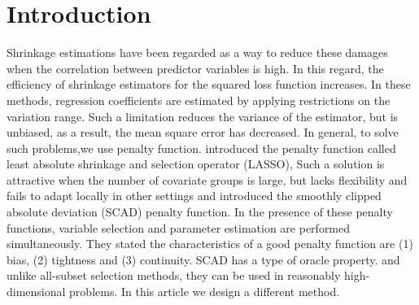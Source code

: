 \section{Introduction}
\qquad Shrinkage estimations have been regarded as a way to reduce these damages when the correlation between predictor variables is high. In this regard, the efficiency of shrinkage estimators for the squared loss function increases. In these methods, regression coefficients are estimated by applying restrictions on the variation range. Such a limitation reduces the variance of the estimator, but is unbiased, as a result, the mean square error has decreased. In general, to solve such problems,we use penalty function. \cite{Tibshirani1996} introduced the penalty function called least absolute shrinkage and selection operator (LASSO), Such a solution is attractive when the number of covariate groups is large, but lacks flexibility and fails to adapt locally in other settings and \hbox{\cite{Fan-Li2001}} introduced the smoothly clipped absolute deviation (SCAD) penalty function. In the presence of these penalty functions, variable selection and parameter estimation are performed simultaneously. They stated the characteristics of a good penalty function are (1) bias, (2) tightness and (3) continuity. SCAD has a type of oracle property. and unlike all-subset selection methods, they can be used in reasonably high-dimensional problems. In this article we design a different method.\\
